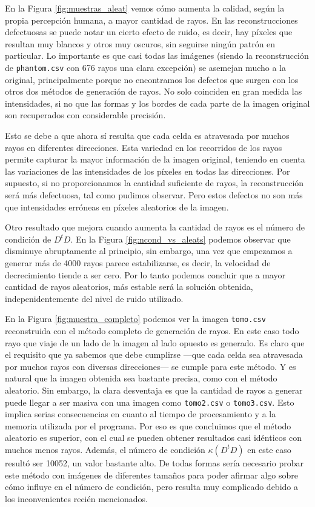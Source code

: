 \documentclass[a4paper]{article}
\begin{document}
En la Figura \ref{fig:muestras_aleat} vemos cómo aumenta la calidad, según la propia percepción humana, a mayor cantidad de rayos. En las 
reconstrucciones defectuosas se puede notar un cierto efecto de ruido, es decir, hay píxeles que resultan muy blancos y otros muy oscuros, sin 
seguirse ningún patrón en particular. Lo importante es que casi todas las imágenes (siendo la reconstrucción de \texttt{phantom.csv} con 676 rayos 
una clara excepción) se asemejan mucho a la original, principalmente porque no encontramos los defectos que surgen con los otros dos métodos de 
generación de rayos. No solo coinciden en gran medida las intensidades, si no que las formas y los bordes de cada parte de la imagen original son 
recuperados con considerable precisión.

Esto se debe a que ahora sí resulta que cada celda es atravesada por muchos rayos en diferentes direcciones. Esta variedad en los recorridos de los 
rayos permite capturar la mayor información de la imagen original, teniendo en cuenta las variaciones de las intensidades de los píxeles en todas 
las direcciones. Por supuesto, si no proporcionamos la cantidad suficiente de rayos, la reconstrucción será más defectuosa, tal como pudimos 
observar. Pero estos defectos no son más que intensidades erróneas en píxeles aleatorios de la imagen.

Otro resultado que mejora cuando aumenta la cantidad de rayos es el número de condición de $D^tD$. En la Figura \ref{fig:ncond_vs_aleats} podemos 
observar que disminuye abruptamente 
al principio, sin embargo, una vez que empezamos a generar más de 4000 rayos parece estabilizarse, es decir, la velocidad de decrecimiento tiende 
a ser cero. Por lo tanto podemos concluir que a mayor cantidad de rayos aleatorios, más estable será la solución obtenida, indepenidentemente del 
nivel de ruido utilizado.

En la Figura \ref{fig:muestra_completo} podemos ver la imagen \texttt{tomo.csv} reconstruida con el método completo de generación de rayos. 
En este caso todo rayo que viaje de un lado de la imagen al lado opuesto es generado. Es claro que el requisito que ya sabemos que debe cumplirse 
---que cada celda sea atravesada por muchos rayos con diversas direcciones--- se cumple para este método. Y es natural que la imagen obtenida 
sea bastante precisa, como con el método aleatorio. Sin embargo, la clara desventaja es que la cantidad de rayos a generar puede llegar a ser masiva 
con una imagen como \texttt{tomo2.csv} o \texttt{tomo3.csv}. Esto implica serias consecuencias en cuanto al tiempo de procesamiento y a la memoria 
utilizada por el programa. Por eso es que concluimos que el método aleatorio es superior, con el cual se pueden obtener resultados casi idénticos 
con muchos menos rayos. Además, el número de condición $\kappa(D^tD)$ en este caso resultó ser 10052, un valor bastante alto. De todas formas sería 
necesario probar este método con imágenes de diferentes tamaños para poder afirmar algo sobre cómo influye en el número de condición, pero resulta 
muy complicado debido a los inconvenientes recién mencionados.
\end{document}
